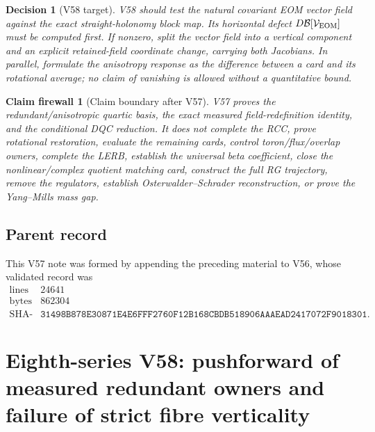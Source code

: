 \documentclass[11pt,oneside]{book}
\newtheorem{firewall}[theorem]{Claim firewall}
\newtheorem{decision}[theorem]{Decision}
\theoremstyle{definition}
\theoremstyle{remark}
\begin{document}
\begin{decision}[V58 target]
\label{dec:e8v57-next}
V58 should test the natural covariant EOM vector field against the
exact straight-holonomy block map.  Its horizontal defect
\(D{\cal B}[{\cal V}_{\rm EOM}]\) must be computed first.  If
nonzero, split the vector field into a vertical component and an
explicit retained-field coordinate change, carrying both
Jacobians.  In parallel, formulate the anisotropy response as the
difference between a card and its rotational average; no claim of
vanishing is allowed without a quantitative bound.
\end{decision}

\begin{firewall}[Claim boundary after V57]
\label{fire:e8v57-claim}
V57 proves the redundant/anisotropic quartic basis, the exact
measured field-redefinition identity, and the conditional DQC
reduction.  It does not complete the RCC, prove rotational
restoration, evaluate the remaining cards, control
toron/flux/overlap owners, complete the LERB, establish the
universal beta coefficient, close the nonlinear/complex quotient
matching card, construct the full RG trajectory, remove the
regulators, establish Osterwalder--Schrader reconstruction, or
prove the Yang--Mills mass gap.
\end{firewall}

\subsection{Parent record}

This V57 note was formed by appending the preceding material to V56,
whose validated record was
\[
\begin{array}{c|c}
\text{lines}&24641\\
\text{bytes}&862304\\
\text{SHA-256}&
\texttt{31498B878E30871E4E6FFF2760F12B168CBDB518906AAAEAD2417072F9018301}.
\end{array}
\]



\section{Eighth-series V58: pushforward of measured redundant
owners and failure of strict fibre verticality}
\label{sec:e8v58}
\end{document}

